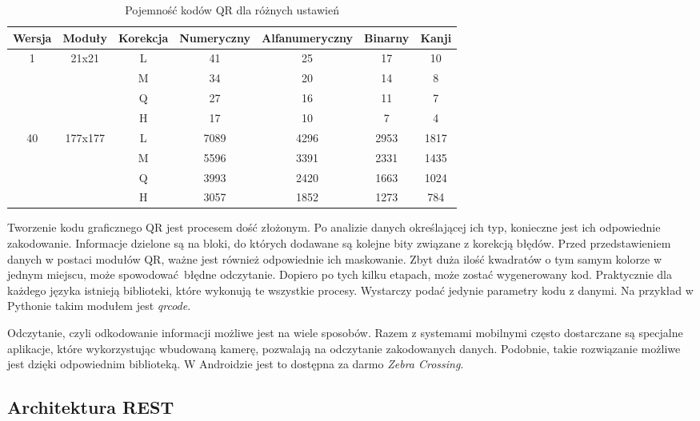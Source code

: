 \begin{table}[h]
	\caption{Pojemność kodów QR dla różnych ustawień}
	\vspace{0.3cm}
	\begin{center}
		\begin{tabular}{| c | c | c | c | c | c | c |}
			\hline
			Wersja & Moduły & Korekcja & Numeryczny & Alfanumeryczny & Binarny & Kanji\\
			\hline
			\multirow{4}{*}{1} & \multirow{4}{*}{21x21}&L&41&25&17&10\\
			& & M&34&20&14&8\\
			& & Q&27&16&11&7\\
			& & H&17&10&7&4\\
			\hline
			\multirow{4}{*}{40} & \multirow{4}{*}{177x177}&L&7089&4296&2953&1817\\
			& & M&5596&3391&2331&1435\\
			& & Q&3993&2420&1663&1024\\
			& & H&3057&1852&1273&784\\
			\hline
		\end{tabular}
	\end{center}
\end{table}

Tworzenie kodu graficznego QR jest procesem dość złożonym. Po analizie danych określającej ich typ, konieczne jest ich odpowiednie zakodowanie. Informacje dzielone są na bloki, do których dodawane są kolejne bity związane z korekcją błędów. Przed przedstawieniem danych w postaci modułów QR, ważne jest również odpowiednie ich maskowanie. Zbyt duża ilość kwadratów o tym samym kolorze w jednym miejscu, może spowodować błędne odczytanie. Dopiero po tych kilku etapach, może zostać wygenerowany kod. Praktycznie dla każdego języka istnieją biblioteki, które wykonują te wszystkie procesy. Wystarczy podać jedynie parametry kodu z danymi. Na przykład w Pythonie takim modułem jest \textit{qrcode}.

Odczytanie, czyli odkodowanie informacji możliwe jest na wiele sposobów. Razem z systemami mobilnymi często dostarczane są specjalne aplikacje, które wykorzystując wbudowaną kamerę, pozwalają na odczytanie zakodowanych danych. Podobnie, takie rozwiązanie możliwe jest dzięki odpowiednim biblioteką. W Androidzie jest to dostępna za darmo \textit{Zebra Crossing}.

\subsection{Architektura REST}

